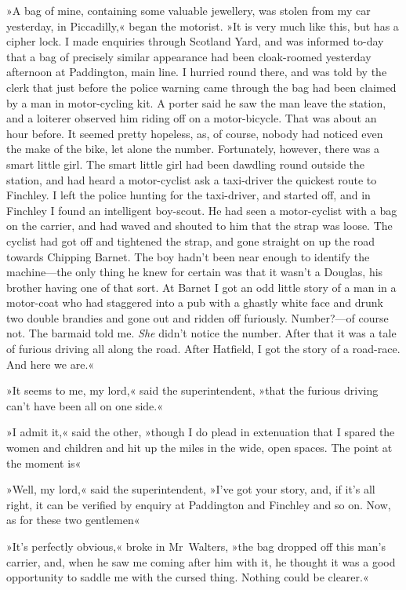 »A bag of mine, containing some valuable jewellery, was stolen from my car yesterday, in Piccadilly,« began the motorist. »It is very much like this, but has a cipher lock. I made enquiries through Scotland Yard, and was informed to-day that a bag of precisely similar appearance had been cloak-roomed yesterday afternoon at Paddington, main line. I hurried round there, and was told by the clerk that just before the police warning came through the bag had been claimed by a man in motor-cycling kit. A porter said he saw the man leave the station, and a loiterer observed him riding off on a motor-bicycle. That was about an hour before. It seemed pretty hopeless, as, of course, nobody had noticed even the make of the bike, let alone the number. Fortunately, however, there was a smart little girl. The smart little girl had been dawdling round outside the station, and had heard a motor-cyclist ask a taxi-driver the quickest route to Finchley. I left the police hunting for the taxi-driver, and started off, and in Finchley I found an intelligent boy-scout. He had seen a motor-cyclist with a bag on the carrier, and had waved and shouted to him that the strap was loose. The cyclist had got off and tightened the strap, and gone straight on up the road towards Chipping Barnet. The boy hadn't been near enough to identify the machine—the only thing he knew for certain was that it wasn't a Douglas, his brother having one of that sort. At Barnet I got an odd little story of a man in a motor-coat who had staggered into a pub with a ghastly white face and drunk two double brandies and gone out and ridden off furiously. Number?—of course not. The barmaid told me. \textit{She} didn't notice the number. After that it was a tale of furious driving all along the road. After Hatfield, I got the story of a road-race. And here we are.«

»It seems to me, my lord,« said the superintendent, »that the furious driving can't have been all on one side.«

»I admit it,« said the other, »though I do plead in extenuation that I spared the women and children and hit up the miles in the wide, open spaces. The point at the moment is\longdash«

»Well, my lord,« said the superintendent, »I've got your story, and, if it's all right, it can be verified by enquiry at Paddington and Finchley and so on. Now, as for these two gentlemen\longdash«

»It's perfectly obvious,« broke in Mr~Walters, »the bag dropped off this man's carrier, and, when he saw me coming after him with it, he thought it was a good opportunity to saddle me with the cursed thing. Nothing could be clearer.«

